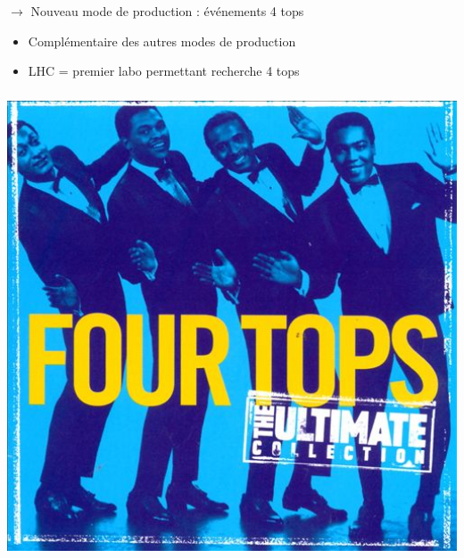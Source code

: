 \begin{frame}
\begin{maliste}
\item[$\rightarrow$] Nouveau mode de production : \'evénements 4 tops 
\begin{itemize}
\item Compl\'ementaire des autres modes de production
\item LHC = premier labo permettant recherche 4 tops
\end{itemize}
\end{maliste}
\end{frame}

\begin{frame}
\frametitle{}
\begin{center}
\vspace*{-0.7cm}
\includegraphics[width=1\textwidth]{Figures/FourTops/TheFourTopsMusic.jpg}
\end{center}
\end{frame}


